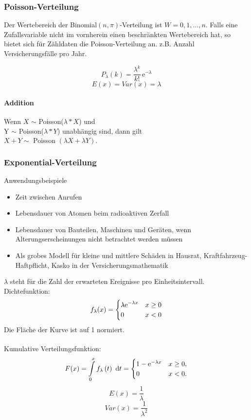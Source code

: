 \documentclass{article}
\begin{document}
\begin{multicols*}{3}
      \subsubsection{Poisson-Verteilung}
      Der Wertebereich der Binomial$(n, \pi)$-Verteilung ist $W = {0, 1, . . . , n}$. Falls
      eine Zufallsvariable nicht im vornherein einen beschränkten Wertebereich hat, so bietet sich für Zähldaten die Poisson-Verteilung an. z.B. Anzahl Versicherungsfälle pro Jahr.

      $$P_{\lambda }(k)={\frac  {\lambda ^{k}}{k!}}\,{\mathrm  {e}}^{{-\lambda }}$$
      $$E(x)=Var(x)=\lambda$$

      \paragraph{Addition}

      Wenn $X$ $\sim$ Poisson($\lambda *X$) und \\Y $\sim$ Poisson($\lambda *Y$) unabhängig sind, dann gilt \\ $X + Y \sim$ Poisson $(\lambda X + \lambda Y)$.

      \subsubsection{Exponential-Verteilung}
      Anwendungsbeispiele
      \begin{itemize}
        \item Zeit zwischen Anrufen
        \item Lebensdauer von Atomen beim radioaktiven Zerfall
        \item Lebensdauer von Bauteilen, Maschinen und Geräten, wenn Alterungserscheinungen nicht betrachtet werden müssen
        \item Als grobes Modell für kleine und mittlere Schäden in Hausrat, Kraftfahrzeug-Haftpflicht, Kasko in der Versicherungsmathematik
      \end{itemize}
      $\lambda$  steht für die Zahl der erwarteten Ereignisse pro Einheitsintervall.\\

      Dichtefunktion:
      $$f_{{\lambda }}(x)={\begin{cases}\displaystyle \lambda {{\rm {e}}}^{{-\lambda x}}&x\geq 0\\0&x<0\end{cases}}$$
      Die Fläche der Kurve ist auf 1 normiert.
      \\ \\
      Kumulative Verteilungsfunktion:
      $$F(x)=\int \limits _{{0}}^{x}f_{\lambda }\left(t\right)\ {{\rm {d}}}t={\begin{cases}1-{\mathrm  {e}}^{{-\lambda x}}&x\geq 0,\\0&x<0.\end{cases}}$$
      $$E(x)= \frac {1}{\lambda}$$
      $$Var(x)= \frac {1}{\lambda ^2}$$


\end{multicols*}
\end{document}
